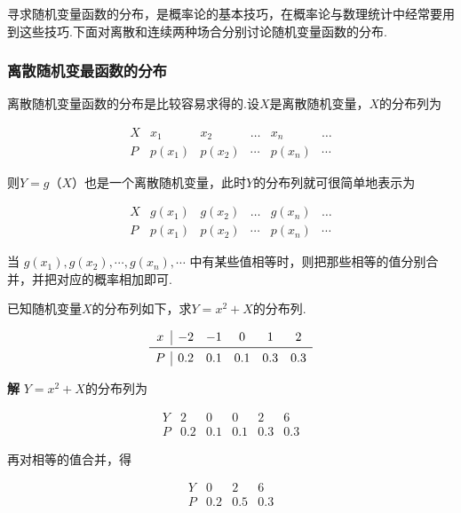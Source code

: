 寻求随机变量函数的分布，是概率论的基本技巧，在概率论与数理统计中经常要用到这些技巧.下面对离散和连续两种场合分别讨论随机变量函数的分布.

\subsubsection{离散随机变最函数的分布}

离散随机变量函数的分布是比较容易求得的.设$ X $是离散随机变量，$ X $的分布列为

\[
\begin{array}{c|ccccc}
{X} & {x_{1}} & {x_{2}} & {\dots} & {x_{n}} & {\dots} \\ \hline 
P & {p\left(x_{1}\right)} & {p\left(x_{2}\right)} & {\cdots} & {p\left(x_{n}\right)} & {\cdots}
\end{array}
\]

则$ Y=g（X） $也是一个离散随机变量，此时$ Y $的分布列就可很简单地表示为

\[
\begin{array}{c|ccccc}
{X} & {g(x_{1})} & {g(x_{2})} & {\dots} & {g(x_{n})} & {\dots} \\ \hline 
P & {p\left(x_{1}\right)} & {p\left(x_{2}\right)} & {\cdots} & {p\left(x_{n}\right)} & {\cdots}
\end{array}
\]

当 $g\left(x_{1}\right), g\left(x_{2}\right), \cdots, g\left(x_{n}\right), \cdots$  中有某些值相等时，则把那些相等的值分别合并，并把对应的概率相加即可.

\begin{example}
	已知随机变量$ X $的分布列如下，求$ Y=x^{2}+X $的分布列.
	
	\[
	\begin{array}{c|ccccc}
	x & {-2} & {-1} & {0} & {1} & {2} \\ \midrule
	P & {0.2} & {0.1} & {0.1} & {0.3} & {0.3} \\ 
	\end{array}
	\]
	
	\textbf{解} $ Y=x^{2}+X $的分布列为
	
	\[
	\begin{array}{c|ccccc}
	Y & {2} & {0} & {0} & {2} & {6} \\ \hline 
	P & {0.2} & {0.1} & {0.1} & {0.3} & {0.3}
	\end{array}
	\]
	
	再对相等的值合并，得
	
	\[
	\begin{array}{c|ccc}
	Y & {0} & {2} & {6} \\ \hline 
	P & {0.2} & {0.5} & {0.3} \\
	\end{array}
	\]
	
\end{example}

